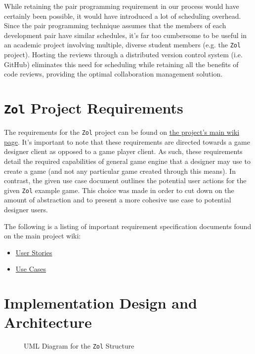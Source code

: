 \documentclass{article}
\newcommand{\classname}[1] {\texttt{#1}}
\newcommand{\projectname}[0] {\texttt{Zol} }
\newcommand{\insertdiagram}[2]
{
	\begin{figure}[H]
		\centering
		\fbox{\texttt{[image: figures/\#1]}}
		\caption{UML Diagram for the \classname{#1} Structure}
	\end{figure}
}
\begin{document}
		While retaining the pair programming requirement in our process would
		have certainly been possible, it would have introduced a lot of
		scheduling overhead.  Since the pair programming technique assumes that 
		the members of each development pair have similar schedules, it's far
		too cumbersome to be useful in an academic project involving multiple,
		diverse student members (e.g. the \projectname project).  Hosting the
		reviews through a distributed version control system (i.e. GitHub) 
		eliminates this need for scheduling while retaining all the benefits 
		of code reviews, providing the optimal collaboration management solution.


	\section[Requirements]{\projectname Project Requirements}
	The requirements for the \projectname project can be found on 
	\href{https://github.com/NintenJoe/zol/wiki}{the project's main wiki page}.
	It's important to note that these requirements are directed towards a game
	designer client as opposed to a game player client.  As such, these
	requirements detail the required capabilities of general game engine that
	a designer may use to create a game (and not any particular game created
	through this means).  In contrast, the given use case document outlines 
	the potential user actions for the given \projectname example game.  This
	choice was made in order to cut down on the amount of abstraction and to
	present a more cohesive use case to potential designer users.

	The following is a listing of important requirement specification documents
	found on the main project wiki:

	\begin{itemize}
		\item \href{https://github.com/NintenJoe/zol/wiki#project-requirements-user-stories}{User Stories}
		\item \href{https://wiki.engr.illinois.edu/download/attachments/233410967/use-cases.pdf}{Use Cases}
	\end{itemize}


	\section[Architecture and Design]{Implementation Design and Architecture}

	\insertdiagram{Zol}{3.0in}
\end{document}
